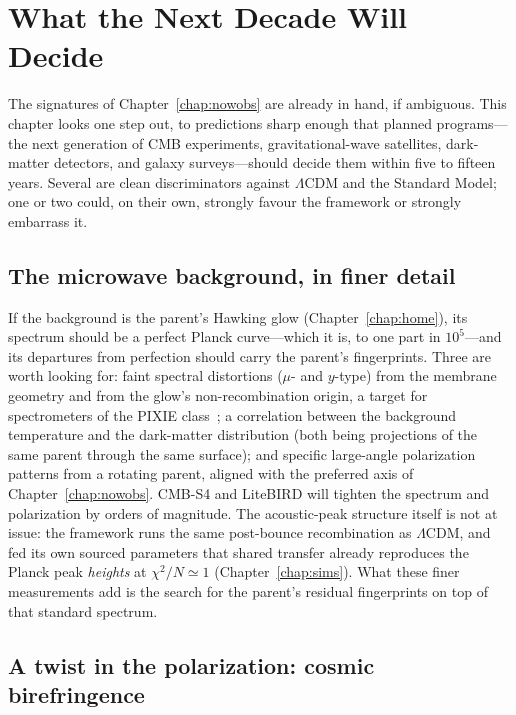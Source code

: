 \chapter{What the Next Decade Will Decide}
\label{chap:nextobs}

The signatures of Chapter~\ref{chap:nowobs} are already in hand, if ambiguous.
This chapter looks one step out, to predictions sharp enough that planned
programs---the next generation of CMB experiments, gravitational-wave satellites,
dark-matter detectors, and galaxy surveys---should decide them within five to
fifteen years. Several are clean discriminators against $\Lambda$CDM and the
Standard Model; one or two could, on their own, strongly favour the framework or
strongly embarrass it.

\section{The microwave background, in finer detail}

If the background is the parent's Hawking glow (Chapter~\ref{chap:home}), its
spectrum should be a perfect Planck curve---which it is, to one part in
$10^{5}$---and its departures from perfection should carry the parent's
fingerprints. Three are worth looking for: faint spectral distortions ($\mu$- and
$y$-type) from the membrane geometry and from the glow's non-recombination origin,
a target for spectrometers of the PIXIE class~\citep{chluba2012}; a correlation
between the background temperature and the
dark-matter distribution (both being projections of the same parent through the
same surface); and specific large-angle polarization patterns from a rotating
parent, aligned with the preferred axis of Chapter~\ref{chap:nowobs}. CMB-S4 and
LiteBIRD will tighten the spectrum and polarization by orders of magnitude. The
acoustic-peak structure itself is not at issue: the framework runs the same
post-bounce recombination as $\Lambda$CDM, and fed its own sourced parameters that
shared transfer already reproduces the Planck peak \emph{heights} at $\chi^2/N\simeq1$
(Chapter~\ref{chap:sims}). What these finer measurements add is the search for the
parent's residual fingerprints on top of that standard spectrum.

\section{A twist in the polarization: cosmic birefringence}
\label{sec:birefringence}

